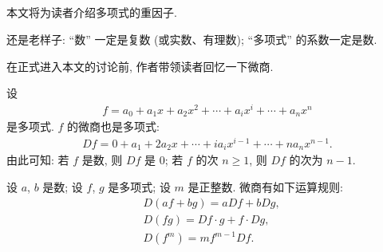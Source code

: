 \subsection*{\MultipleFactors}
\markright{\MultipleFactors}

本文将为读者介绍多项式的重因子.

还是老样子: ``数'' 一定是复数 (或实数、有理数); ``多项式'' 的系数一定是数.

在正式进入本文的讨论前, 作者带领读者回忆一下微商.

设
\begin{align*}
    f = a_0 + a_1 x + a_2 x^2 + \cdots + a_i x^i + \cdots + a_n x^n
\end{align*}
是多项式. $f$ 的微商也是多项式:
\begin{align*}
    Df = 0 + a_1 + 2a_2 x + \cdots + i a_i x^{i-1} + \cdots + n a_n x^{n-1}.
\end{align*}
由此可知: 若 $f$ 是数, 则 $Df$ 是 $0$; 若 $f$ 的次 $n \geq 1$, 则 $Df$ 的次为 $n - 1$.

设 $a$, $b$ 是数; 设 $f$, $g$ 是多项式; 设 $m$ 是正整数. 微商有如下运算规则:
\begin{align*}
     & D(af + bg) = aDf + bDg,          \\
     & D(fg) = Df \cdot g + f \cdot Dg, \\
     & D(f^m) = mf^{m-1} Df.
\end{align*}

